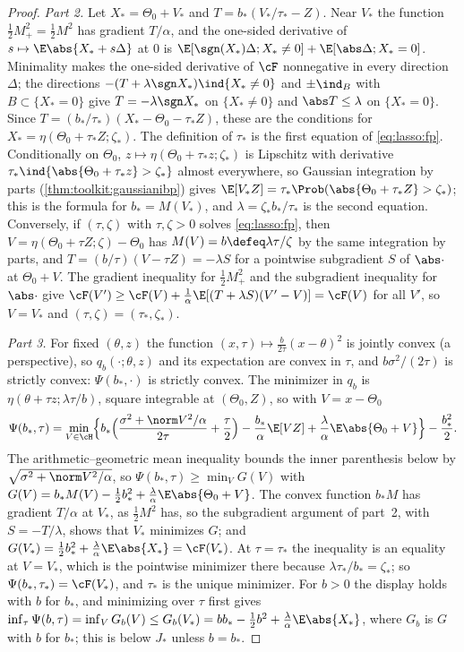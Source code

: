\begin{refsection}
\begin{proof}
\emph{Part 2.} Let $X_*=\Theta_0+V_*$ and $T=b_*(V_*/\tau_*-Z)$. Near $V_*$ the function $\frac12M_+^2=\frac12M^2$ has gradient $T/\alpha$, and the one-sided derivative of $s\mapsto\E\abs{X_*+s\Delta}$ at $0$ is $\E[\sgn(X_*)\Delta;X_*\ne0]+\E[\abs\Delta;X_*=0]$. Minimality makes the one-sided derivative of $\cF$ nonnegative in every direction $\Delta$; the directions $-(T+\lambda\sgn X_*)\ind\{X_*\ne0\}$ and $\pm\ind_B$ with $B\subset\{X_*=0\}$ give $T=-\lambda\sgn X_*$ on $\{X_*\ne0\}$ and $\abs T\le\lambda$ on $\{X_*=0\}$. Since $T=(b_*/\tau_*)(X_*-\Theta_0-\tau_*Z)$, these are the conditions for $X_*=\eta(\Theta_0+\tau_*Z;\zeta_*)$. The definition of $\tau_*$ is the first equation of \eqref{eq:lasso:fp}. Conditionally on $\Theta_0$, $z\mapsto\eta(\Theta_0+\tau_*z;\zeta_*)$ is Lipschitz with derivative $\tau_*\ind\{\abs{\Theta_0+\tau_*z}>\zeta_*\}$ almost everywhere, so Gaussian integration by parts (\cref{thm:toolkit:gaussianibp}) gives $\E[V_*Z]=\tau_*\Prob(\abs{\Theta_0+\tau_*Z}>\zeta_*)$; this is the formula for $b_*=M(V_*)$, and $\lambda=\zeta_*b_*/\tau_*$ is the second equation. Conversely, if $(\tau,\zeta)$ with $\tau,\zeta>0$ solves \eqref{eq:lasso:fp}, then $V=\eta(\Theta_0+\tau Z;\zeta)-\Theta_0$ has $M(V)=b\defeq\lambda\tau/\zeta$ by the same integration by parts, and $T=(b/\tau)(V-\tau Z)=-\lambda S$ for a pointwise subgradient $S$ of $\abs\cdot$ at $\Theta_0+V$. The gradient inequality for $\frac12M_+^2$ and the subgradient inequality for $\abs\cdot$ give $\cF(V')\ge\cF(V)+\frac1\alpha\E[(T+\lambda S)(V'-V)]=\cF(V)$ for all $V'$, so $V=V_*$ and $(\tau,\zeta)=(\tau_*,\zeta_*)$.

\emph{Part 3.} For fixed $(\theta,z)$ the function $(x,\tau)\mapsto\frac b{2\tau}(x-\theta)^2$ is jointly convex (a perspective), so $q_b(\cdot;\theta,z)$ and its expectation are convex in $\tau$, and $b\sigma^2/(2\tau)$ is strictly convex: $\Psi(b_*,\cdot)$ is strictly convex. The minimizer in $q_b$ is $\eta(\theta+\tau z;\lambda\tau/b)$, square integrable at $(\Theta_0,Z)$, so with $V=x-\Theta_0$
\[
\Psi(b_*,\tau)=\min_{V\in\cH}\Bigl\{b_*\Bigl(\frac{\sigma^2+\norm V^2/\alpha}{2\tau}+\frac\tau2\Bigr)-\frac{b_*}\alpha\E[VZ]+\frac\lambda\alpha\E\abs{\Theta_0+V}\Bigr\}-\frac{b_*^2}2.
\]
The arithmetic--geometric mean inequality bounds the inner parenthesis below by $\sqrt{\sigma^2+\norm V^2/\alpha}$, so $\Psi(b_*,\tau)\ge\min_VG(V)$ with $G(V)=b_*M(V)-\frac12b_*^2+\frac\lambda\alpha\E\abs{\Theta_0+V}$. The convex function $b_*M$ has gradient $T/\alpha$ at $V_*$, as $\frac12M^2$ has, so the subgradient argument of part~2, with $S=-T/\lambda$, shows that $V_*$ minimizes $G$; and $G(V_*)=\frac12b_*^2+\frac\lambda\alpha\E\abs{X_*}=\cF(V_*)$. At $\tau=\tau_*$ the inequality is an equality at $V=V_*$, which is the pointwise minimizer there because $\lambda\tau_*/b_*=\zeta_*$; so $\Psi(b_*,\tau_*)=\cF(V_*)$, and $\tau_*$ is the unique minimizer. For $b>0$ the display holds with $b$ for $b_*$, and minimizing over $\tau$ first gives $\inf_\tau\Psi(b,\tau)=\inf_VG_b(V)\le G_b(V_*)=bb_*-\frac12b^2+\frac\lambda\alpha\E\abs{X_*}$, where $G_b$ is $G$ with $b$ for $b_*$; this is below $J_*$ unless $b=b_*$.
\end{proof}


\end{refsection}

